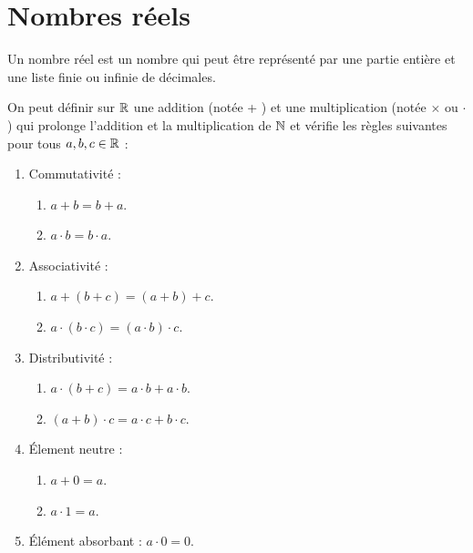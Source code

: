 \chapter{Nombres réels}\label{chap:nb_reels}
\def\arraystretch{1}

\begin{definition}
    Un nombre réel est un nombre qui peut être représenté par une partie entière et une liste finie ou infinie de décimales.
\end{definition}

\begin{proposition}
    On peut définir sur $\mathbb{R}$ une addition (notée \og + \fg) et une multiplication (notée \og $\times$ \fg ou \og $\cdot$ \fg) qui prolonge l'addition et la multiplication de $\mathbb{N}$ et vérifie les règles suivantes pour tous $a, b, c \in \mathbb{R}$ :
    \begin{enumerate}
        \item Commutativité : 
        \begin{enumerate}
        	\item $a + b = b + a$.
        	\item $a \cdot b = b \cdot a$.
        \end{enumerate}
        \item Associativité : 
        \begin{enumerate}
        	\item $a + (b + c) = (a + b) + c$.
        	\item $a \cdot (b \cdot c) = (a \cdot b) \cdot c$.
        \end{enumerate}
        \item Distributivité : 
		\begin{enumerate}
			\item $a \cdot (b + c) = a \cdot b + a \cdot b$.
			\item $(a + b) \cdot c = a \cdot c + b \cdot c$.
		\end{enumerate}
        \item \'Element neutre :
        \begin{enumerate}
        	\item $a + 0 = a$.
        	\item $a \cdot 1 = a$.
        \end{enumerate}
        \item \'Elément absorbant : $a \cdot 0 = 0$.
    \end{enumerate}
\end{proposition}

